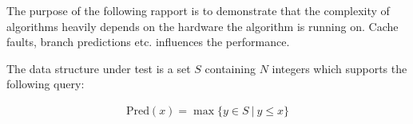 
The purpose of the following rapport is to demonstrate that the complexity of algorithms heavily depends on the hardware the algorithm is running on. Cache faults, branch predictions etc. influences the performance.

The data structure under test is a set $S$ containing $N$ integers which supports the following query:

\begin{eqnarray*}
\mathrm{Pred}(x) = \max \{ y \in S\ |\ y \leq x \}
\end{eqnarray*}